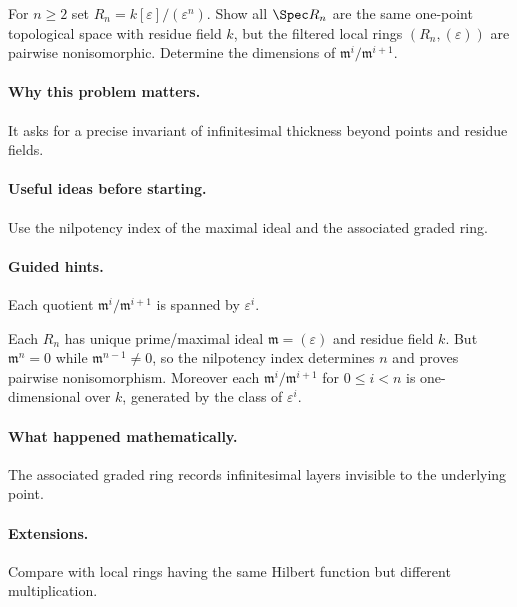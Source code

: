 \begin{problem}
For $n\ge2$ set $R_n=k[\varepsilon]/(\varepsilon^n)$.  Show all $\Spec R_n$ are the same one-point topological space with residue field $k$, but the filtered local rings $(R_n,(\varepsilon))$ are pairwise nonisomorphic.  Determine the dimensions of $\mathfrak m^i/\mathfrak m^{i+1}$.
\end{problem}

\paragraph{Why this problem matters.}
It asks for a precise invariant of infinitesimal thickness beyond points and residue fields.

\paragraph{Useful ideas before starting.}
Use the nilpotency index of the maximal ideal and the associated graded ring.

\paragraph{Guided hints.}
Each quotient $\mathfrak m^i/\mathfrak m^{i+1}$ is spanned by $\varepsilon^i$.

\begin{solution}
Each $R_n$ has unique prime/maximal ideal $\mathfrak m=(\varepsilon)$ and residue field $k$.  But $\mathfrak m^n=0$ while $\mathfrak m^{n-1}\neq0$, so the nilpotency index determines $n$ and proves pairwise nonisomorphism.  Moreover each $\mathfrak m^i/\mathfrak m^{i+1}$ for $0\le i<n$ is one-dimensional over $k$, generated by the class of $\varepsilon^i$.
\end{solution}

\paragraph{What happened mathematically.}
The associated graded ring records infinitesimal layers invisible to the underlying point.

\paragraph{Extensions.}
Compare with local rings having the same Hilbert function but different multiplication.

